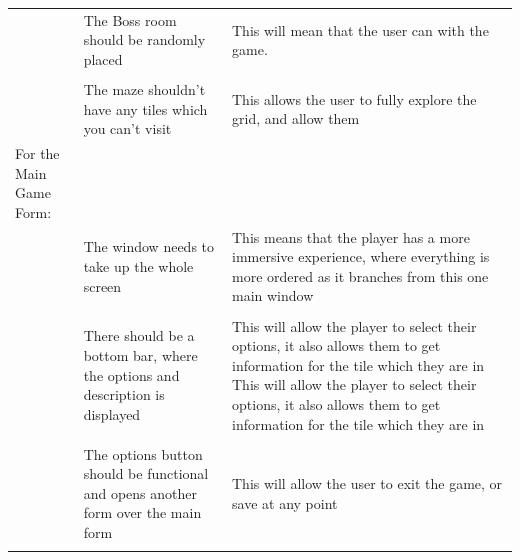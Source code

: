 \documentclass[12pt]{article}
\begin{document}
\begin{tabularx}{\linewidth}{XXX}
                        \\
                        & The Boss room should be randomly placed                                                            & This will mean that the user can with the game.                                                                                                                                                                                                   \\ \\
                        & The maze shouldn't have any tiles which you can't visit                                            & This allows the user to fully explore the grid, and allow them                                                                                                                                                                                     \\
For the Main Game Form: &                                                                                                    &                                                                                                                                                                                                                                                    \\
                        & The window needs to take up the whole screen                                                       & This means that the player has a more immersive experience, where everything is more ordered as it branches from this one main window                                                                                                             \\ \\
                        & There should be a bottom bar, where the options and description is displayed                       & This will allow the player to select their options, it also allows them to get information for the tile which they are in This will allow the player to select their options, it also allows them to get information for the tile which they are in \\\\
                        & The options button should be functional and opens another form over the main form                & This will allow the user to exit the game, or save at any point                                                                                                                                                                                    \\\\

\end{tabularx}
\end{document}
